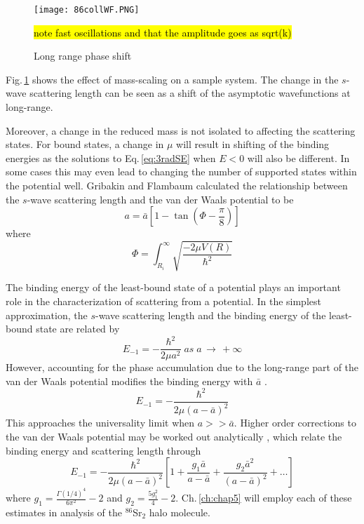 \begin{figure} \label{fig:longRange}
	\centerline{
	\texttt{[image: 86collWF.PNG]}}
	\caption{Long range phase shift}{ \hl{note fast oscillations and that the amplitude goes as sqrt(k)}}
\end{figure} 
Fig.\,\ref{fig:longRange} shows the effect of mass-scaling on a sample system.
The change in the $s$-wave scattering length can be seen as a shift of the asymptotic wavefunctions at long-range.

Moreover, a change in the reduced mass is not isolated to affecting the scattering states.
For bound states, a change in $\mu$ will result in shifting of the binding energies as the solutions to Eq.\,\ref{eq:3radSE} when $E<0$ will also be different.
In some cases this may even lead to changing the number of supported states within the potential well.
Gribakin and Flambaum \cite{gfl93} calculated the relationship between the $s$-wave scattering length and the van der Waals potential to be
\begin{equation}
	a = \bar{a} \left[ 1 - \tan(\Phi - \frac{\pi}{8}) \right]
\end{equation} 
where
\begin{equation}
	\Phi = \int_{R_i}^{\infty} \sqrt{\frac{-2\mu V(R)}{\hbar^2}}
\end{equation}

The binding energy of the least-bound state of a potential plays an important role in the characterization of scattering from a potential.
In the simplest approximation, the $s$-wave scattering length and the binding energy of the least-bound state are related by
\begin{equation}
	E_{-1} = -\frac{\hbar^2}{2 \mu a^2} \; as \; a\,\rightarrow\,+\infty
\end{equation}
However, accounting for the phase accumulation due to the long-range part of the van der Waals potential modifies the binding energy with $\bar{a}$ \cite{gfl93}.
\begin{equation}
	E_{-1} = -\frac{\hbar^2}{2\mu(a-\bar{a})^2}
\end{equation}
This approaches the universality limit when $a >> \bar{a}$.
Higher order corrections to the van der Waals potential may be worked out analytically \cite{gao04}, which relate the binding energy and scattering length through
\begin{equation}
	E_{-1} = -\frac{\hbar^2}{2\mu(a-\bar{a})^2}\left[1 + \frac{g_1 \bar{a}}{a-\bar{a}} + \frac{g_2 \bar{a}^2}{(a-\bar{a})^2}+\dots \right]
\end{equation}
where $g_1=\frac{\Gamma(1/4)^4}{6 \pi^2} - 2$ and $g_2 = \frac{5 g_1^2}{4} - 2$.
Ch.\,\ref{ch:chap5} will employ each of these estimates in analysis of the $^{86}$Sr$_2$ halo molecule.

